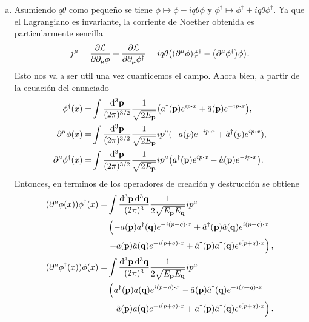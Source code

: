 \documentclass{article}
\begin{document}
\begin{enumerate}[(a)]
\item Asumiendo $q\theta$ como pequeño se tiene $\phi\mapsto\phi-iq\theta\phi$ y $\phi^\dagger\mapsto\phi^\dagger+iq\theta\phi^\dagger$. Ya que el Lagrangiano es invariante, la corriente de Noether obtenida es particularmente sencilla
\begin{equation}\label{ec:corriente_escalar}
j^\mu=\pdv{\mathcal{L}}{\partial_\mu\phi} (-iq\theta\phi)+\pdv{\mathcal{L}}{\partial_\mu\phi^\dagger} (iq\theta\phi^\dagger)=iq\theta\qty((\partial^\mu\phi)\phi^\dagger-\qty(\partial^\mu\phi^\dagger)\phi).
\end{equation}
Esto nos va a ser util una vez cuanticemos el campo. Ahora bien, a partir de la ecuación del enunciado
\begin{align}
\begin{split}
\phi^\dagger(x)=&\int\frac{\dd[3]{\vb{p}}}{(2\pi)^{3/2}}\frac{1}{\sqrt{2E_{\vb{p}}}}\qty(a^\dagger(\vb{p})e^{ip\vdot x}+\hat{a}(\vb{p})e^{-ip\vdot x}),\\
\partial^\mu\phi(x)=&\int\frac{\dd[3]{\vb{p}}}{(2\pi)^{3/2}}\frac{1}{\sqrt{2E_{\vb{p}}}}ip^\mu(-a(p)e^{-ip\vdot x}+\hat{a}^\dagger(p)e^{ip\vdot x}),\\
\partial^\mu\phi^\dagger(x)=&\int\frac{\dd[3]{\vb{p}}}{(2\pi)^{3/2}}\frac{1}{\sqrt{2E_{\vb{p}}}}ip^\mu\qty(a^\dagger(\vb{p})e^{ip\vdot x}-\hat{a}(\vb{p})e^{-ip\vdot x}).
\end{split}
\end{align}
Entonces, en terminos de los operadores de creación y destrucción se obtiene
\begin{align}
\begin{split}
(\partial^\mu\phi(x))\phi^\dagger(x)=&\int\frac{\dd[3]{\vb{p}}\dd[3]{\vb{q}}}{(2\pi)^3}\frac{1}{2\sqrt{E_{\vb{p}}E_{\vb{q}}}}ip^\mu\\
&\left(-a(\vb{p})a^\dagger(\vb{q})e^{-i(p-q)\vdot x}+\hat{a}^\dagger(\vb{p})\hat{a}(\vb{q})e^{i(p-q)\vdot x}\right.\\
&\left.-a(\vb{p})\hat{a}(\vb{q})e^{-i(p+q)\vdot x}+\hat{a}^\dagger(\vb{p})a^\dagger(\vb{q})e^{i(p+q)\vdot x}\right),\\
(\partial^\mu\phi^\dagger(x))\phi(x)=&\int\frac{\dd[3]{\vb{p}}\dd[3]{\vb{q}}}{(2\pi)^3}\frac{1}{2\sqrt{E_{\vb{p}}E_{\vb{q}}}}ip^\mu\\
&\left(a^\dagger(\vb{p})a(\vb{q})e^{i(p-q)\vdot x}-\hat{a}(\vb{p})\hat{a}^\dagger(\vb{q})e^{-i(p-q)\vdot x}\right.\\
&\left.-\hat{a}(\vb{p})a(\vb{q})e^{-i(p+q)\vdot x}+a^\dagger(\vb{p})\hat{a}^\dagger(\vb{q})e^{i(p+q)\vdot x}\right).

\end{split}
\end{align}
\end{enumerate}
\end{document}

